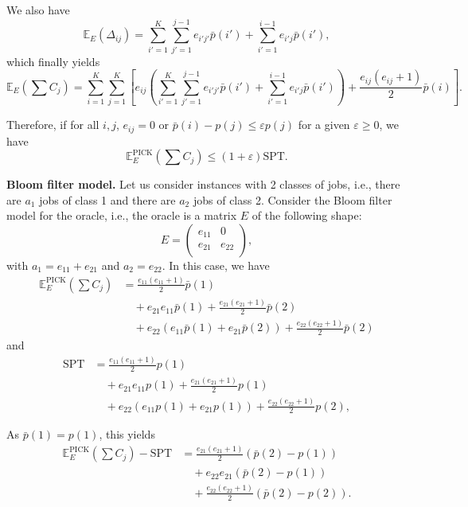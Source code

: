 \documentclass{article}
\begin{document}
We also have
\[
    \mathbb{E}_E\left(\Delta_{ij}\right)=
        \sum_{i'=1}^K \sum_{j'=1}^{j-1} e_{i'j'} \bar{p}(i')
        + \sum_{i'=1}^{i-1} e_{i'j} \bar{p}(i'),
\]
which finally yields
\[
    \mathbb{E}_E\left(\sum C_j\right)=
        \sum_{i=1}^K \sum_{j=1}^K\left[
            e_{ij}\left(\sum_{i'=1}^K \sum_{j'=1}^{j-1} e_{i'j'} \bar{p}(i')
                + \sum_{i'=1}^{i-1} e_{i'j} \bar{p}(i')\right) +
            \frac{e_{ij}(e_{ij}+1)}{2}\bar{p}(i)
        \right].
\]

Therefore, if for all \(i,j\), \(e_{ij}=0\) or \(\bar{p}(i)-p(j)\le\varepsilon p(j)\) for a given \(\varepsilon\ge 0\), we have
\[
    \mathbb{E}^{\text{PICK}}_E\left(\sum C_j\right)\le (1+\varepsilon)\text{SPT}.
\]


\noindent\textbf{Bloom filter model.}
Let us consider instances with 2 classes of jobs, i.e., there are \(a_1\) jobs of class 1 and there are \(a_2\) jobs of class 2.
Consider the Bloom filter model for the oracle, i.e., the oracle is a matrix \(E\) of the following shape:
\[
    E=\begin{pmatrix}
        e_{11} & 0 \\
        e_{21} & e_{22} \\
    \end{pmatrix},
\]
with \(a_1=e_{11}+e_{21}\) and \(a_2=e_{22}\).
In this case, we have
\begin{align*}
    \mathbb{E}_E^{\text{PICK}}\left(\sum C_j\right)
    &=\frac{e_{11}(e_{11}+1)}{2}\bar{p}(1) \\
    &\quad+e_{21}e_{11}\bar{p}(1)+\frac{e_{21}(e_{21}+1)}{2}\bar{p}(2) \\
    &\quad+e_{22}(e_{11}\bar{p}(1)+e_{21}\bar{p}(2))+\frac{e_{22}(e_{22}+1)}{2}\bar{p}(2)
\end{align*}
and
\begin{align*}
    \text{SPT}
    &=\frac{e_{11}(e_{11}+1)}{2}p(1) \\
    &\quad+e_{21}e_{11}p(1)+\frac{e_{21}(e_{21}+1)}{2}p(1) \\
    &\quad+e_{22}(e_{11}p(1)+e_{21}p(1))+\frac{e_{22}(e_{22}+1)}{2}p(2),
\end{align*}

As \(\bar{p}(1)=p(1)\), this yields
\begin{align*}
    \mathbb{E}_E^{\text{PICK}}\left(\sum C_j\right)-\text{SPT}
    &=\frac{e_{21}(e_{21}+1)}{2}(\bar{p}(2)-p(1)) \\
    &\quad+e_{22}e_{21}(\bar{p}(2)-p(1)) \\
    &\quad+\frac{e_{22}(e_{22}+1)}{2}(\bar{p}(2)-p(2)).
\end{align*}
\end{document}
